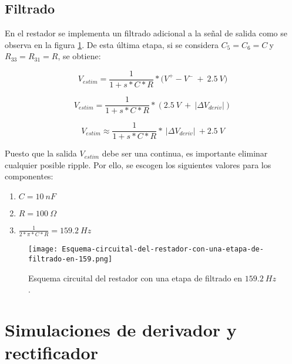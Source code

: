 \subsection{Filtrado}

En el restador se implementa un filtrado adicional a la señal de salida como se observa en la figura  \ref{fig:img_Esquema-circuital-del-restador-con-una-etapa-de-filtrado-en-159}. De esta \'{u}ltima etapa, si se considera $C_5=C_6=C\ $y $R_{33}=R_{31}=R$, se obtiene:



\begin{equation}
	V_{estim}=\frac{1}{1+s*C*R}*{(V}^+-V^-\ +\ 2.5\:V)
\end{equation}

\begin{equation} \label{eq_Vestim_1}
	V_{estim}=\frac{1}{1+s*C*R}*(2.5\: V\ +\ |\mathit{\Delta}V_{deriv}|)
\end{equation}

\begin{equation} \label{eq_Vestim_2}
	V_{estim} \approx \frac{1}{1+s*C*R}*\ |\mathit{\Delta}V_{deriv}|\ +2.5\:V
\end{equation}



Puesto que la salida $V_{estim}$ debe ser una continua, es importante eliminar cualquier posible ripple. Por ello, se escogen los siguientes valores para los componentes:

\begin{enumerate}
	\item  $C=10\: nF$
	
	\item  $R=100\:\Omega$
	
	\item  $\frac{1}{2*\pi *C*R}=159.2\: Hz$
\end{enumerate}

\begin{figure}[H]
	\centering
	\texttt{[image: Esquema-circuital-del-restador-con-una-etapa-de-filtrado-en-159.png]}
	\caption{Esquema circuital del restador con una etapa de filtrado en $159.2\: Hz$.}
	\label{fig:img_Esquema-circuital-del-restador-con-una-etapa-de-filtrado-en-159}
\end{figure}


\section{Simulaciones de derivador y rectificador}



